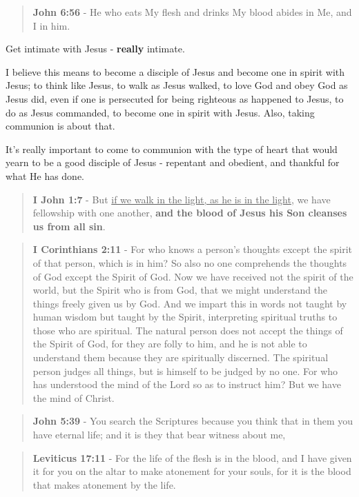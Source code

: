 \documentclass[11pt]{article}
\begin{document}
\begin{quote}
\textbf{John 6:56} - He who eats My flesh and drinks My blood abides in Me, and I in him.
\end{quote}

Get intimate with Jesus - \textbf{really} intimate.

I believe this means to become a disciple of Jesus and become one in spirit with Jesus; to think like Jesus, to walk as Jesus walked, to love God and obey God as Jesus did, even if one is persecuted for being righteous as happened to Jesus, to do as Jesus commanded, to become one in spirit with Jesus. Also, taking communion is about that.

It's really important to come to communion with the type of heart that would yearn to be a good disciple of Jesus - repentant and obedient, and thankful for what He has done.

\begin{quote}
\textbf{I John 1:7} - But \uline{if we walk in the light, as he is in the light}, we have fellowship with one another, \textbf{and the blood of Jesus his Son cleanses us from all sin}.
\end{quote}

\begin{quote}
\textbf{I Corinthians 2:11} - For who knows a person's thoughts except the spirit of that person, which is in him? So also no one comprehends the thoughts of God except the Spirit of God. Now we have received not the spirit of the world, but the Spirit who is from God, that we might understand the things freely given us by God. And we impart this in words not taught by human wisdom but taught by the Spirit, interpreting spiritual truths to those who are spiritual. The natural person does not accept the things of the Spirit of God, for they are folly to him, and he is not able to understand them because they are spiritually discerned. The spiritual person judges all things, but is himself to be judged by no one. For who has understood the mind of the Lord so as to instruct him? But we have the mind of Christ.
\end{quote}

\begin{quote}
\textbf{John 5:39} - You search the Scriptures because you think that in them you have eternal life; and it is they that bear witness about me,
\end{quote}

\begin{quote}
\textbf{Leviticus 17:11} - For the life of the flesh is in the blood, and I have given it for you on the altar to make atonement for your souls, for it is the blood that makes atonement by the life.
\end{quote}
\end{document}
